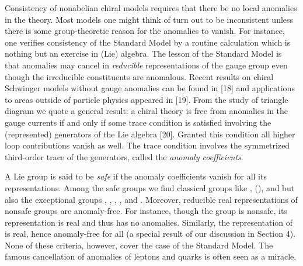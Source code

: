 \documentclass[11pt,a4paper]{article}
\providecommand{\bw}{{\textstyle\bigwedge}}
\begin{document}
Consistency of nonabelian chiral models requires that there be no local 
anomalies in 
the theory. Most models one might think of turn out to be inconsistent 
unless there is some group-theoretic reason for the anomalies to vanish.
For instance, one verifies consistency of the Standard Model 
by a routine calculation which is nothing but an exercise in (Lie) algebra.
The lesson of the Standard Model is that anomalies may cancel in
{\em reducible\/} representations of the gauge group even though the
irreducible constituents are anomalous. 
Recent results on chiral Schwinger models without gauge anomalies can be
found in [18] and applications to areas outside of particle physics appeared
in [19]. From the study of triangle diagram we
quote a general result: a chiral theory is free from anomalies in the
gauge currents if and only if some trace condition is satisfied involving 
the (represented) generators of the Lie algebra [20]. Granted this condition
all higher loop contributions vanish as well. The trace condition involves
the symmetrized third-order trace of the generators, called the {\em anomaly
coefficients}.

A Lie group is said to be {\em safe} if the anomaly coefficients vanish for
all its representations. Among the safe groups we find classical groups like
\coordHE{}, \coordHE{} (\coordHE{}), and \coordHE{} but also the exceptional groups
\coordHE{}, \coordHE{}, \coordHE{}, \coordHE{}, and \coordHE{}. Moreover, reducible real 
representations of nonsafe groups are anomaly-free. For instance, though 
the group \coordHE{} is nonsafe, its representation \coordHE{} is
real and thus has no anomalies. Similarly, the representation \myHighlight{$\bw$}\coordHE{} of
\coordHE{} is real, hence anomaly-free for all \coordHE{} (a special result of our
discussion in Section 4). None of these criteria, however, cover the case of 
the Standard Model. The famous cancellation of anomalies of leptons and quarks
is often seen as a miracle.
\end{document}
